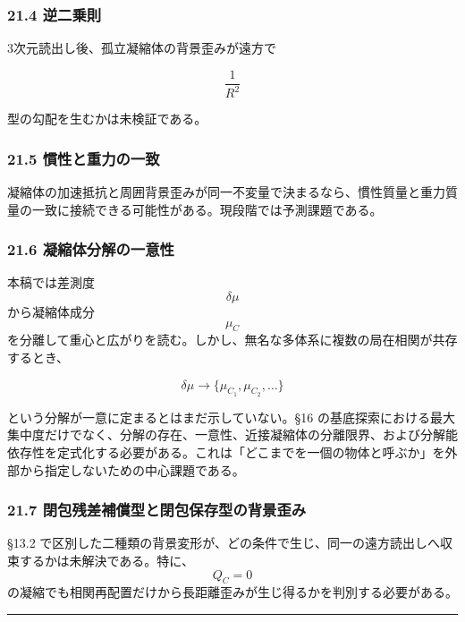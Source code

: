 \documentclass[
  a4paper,
]{ltjsarticle}
\begin{document}
\subsubsection{21.4 逆二乗則}\label{ux9006ux4e8cux4e57ux5247}

3次元読出し後、孤立凝縮体の背景歪みが遠方で

\[
\frac{1}{R^2}
\]

型の勾配を生むかは未検証である。

\subsubsection{21.5
慣性と重力の一致}\label{ux6163ux6027ux3068ux91cdux529bux306eux4e00ux81f4}

凝縮体の加速抵抗と周囲背景歪みが同一不変量で決まるなら、慣性質量と重力質量の一致に接続できる可能性がある。現段階では予測課題である。

\subsubsection{21.6
凝縮体分解の一意性}\label{ux51ddux7e2eux4f53ux5206ux89e3ux306eux4e00ux610fux6027}

本稿では差測度 \[\delta\mu\] から凝縮体成分 \[\mu_C\]
を分離して重心と広がりを読む。しかし、無名な多体系に複数の局在相関が共存するとき、

\[
\delta\mu
\longrightarrow
\{\mu_{C_1},\mu_{C_2},\ldots\}
\]

という分解が一意に定まるとはまだ示していない。§16
の基底探索における最大集中度だけでなく、分解の存在、一意性、近接凝縮体の分離限界、および分解能依存性を定式化する必要がある。これは「どこまでを一個の物体と呼ぶか」を外部から指定しないための中心課題である。

\subsubsection{21.7
閉包残差補償型と閉包保存型の背景歪み}\label{ux9589ux5305ux6b8bux5deeux88dcux511fux578bux3068ux9589ux5305ux4fddux5b58ux578bux306eux80ccux666fux6b6aux307f}

§13.2
で区別した二種類の背景変形が、どの条件で生じ、同一の遠方読出しへ収束するかは未解決である。特に、\[Q_C=0\]
の凝縮でも相関再配置だけから長距離歪みが生じ得るかを判別する必要がある。

\begin{center}\rule{0.5\linewidth}{0.5pt}\end{center}
\end{document}
